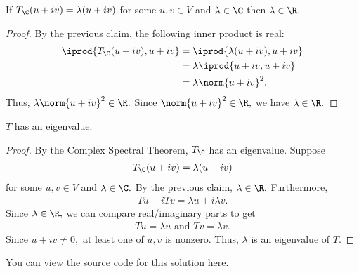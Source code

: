 \documentclass{amsart}
\newcommand{\pagenum}{294}
\newcommand{\probnum}{5}
\begin{document}
\begin{claim*}
If $T_\C(u+iv)=\lambda(u+iv)$ for some $u,v\in V$ and $\lambda\in\C$
then $\lambda\in\R.$
\end{claim*}
\begin{proof}
By the previous claim, the following inner product is real:
\begin{align*}
    \iprod{T_\C(u+iv),u+iv} &= \iprod{\lambda(u+iv),u+iv} \\
                            &= \lambda\iprod{u+iv,u+iv} \\
                            &= \lambda\norm{u+iv}^2.
\end{align*}
Thus, $\lambda\norm{u+iv}^2\in\R.$ Since $\norm{u+iv}^2\in\R,$
we have $\lambda\in\R.$
\end{proof}

\begin{claim*}
$T$ has an eigenvalue.
\end{claim*}
\begin{proof}
By the Complex Spectral Theorem, $T_\C$ has an eigenvalue. Suppose
\begin{align*}
    T_\C(u+iv)=\lambda(u+iv)
\end{align*}
for some $u,v\in V$ and $\lambda\in\C.$
By the previous claim, $\lambda\in\R.$
Furthermore,
\begin{align*}
    Tu+iTv=\lambda u+i\lambda v.
\end{align*}
Since $\lambda\in\R,$ we can compare real/imaginary parts to get
\begin{align*}
Tu=\lambda u\text{ and }Tv=\lambda v.
\end{align*}
Since $u+iv\ne 0,$ at least one of $u,v$ is nonzero. Thus, $\lambda$
is an eigenvalue of $T.$
\end{proof}

\vspace{0.5in}

\begin{note*}
You can view the source code for this solution
\href{https://github.com/thomasbreydo/linalg/blob/main/\pagenum_\probnum_Thomas_Breydo.tex}
{here}.
\end{note*}
\end{document}
